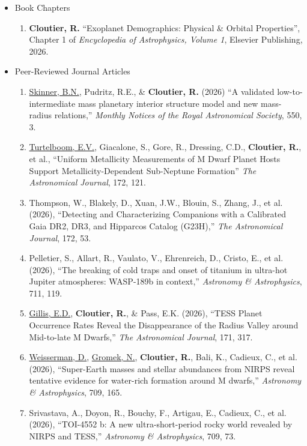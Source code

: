 \documentclass[12pt]{article}
\begin{document}
\begin{itemize}
\item Book Chapters
\begin{enumerate}
\item {\bf Cloutier, R.} ``Exoplanet Demographics: Physical \& Orbital Properties'', Chapter 1 of {\it Encyclopedia of Astrophysics, Volume 1}, Elsevier Publishing, 2026.
\end{enumerate}

\item Peer-Reviewed Journal Articles

\begin{enumerate}
\item \underline{Skinner, B.N.}, Pudritz, R.E., \& {\bf Cloutier, R.} (2026) ``A validated low-to-intermediate mass planetary interior structure model and new mass-radius relations,'' {\it  Monthly Notices of the Royal Astronomical Society}, 550, 3.
\item \underline{Turtelboom, E.V.}, Giacalone, S., Gore, R., Dressing, C.D., {\bf Cloutier, R.}, et al., ``Uniform Metallicity Measurements of M Dwarf Planet Hosts Support Metallicity-Dependent Sub-Neptune Formation'' {\it The Astronomical Journal}, 172, 121.
\item Thompson, W., Blakely, D., Xuan, J.W., Blouin, S., Zhang, J., et al. (2026), ``Detecting and Characterizing Companions with a Calibrated Gaia DR2, DR3, and Hipparcos Catalog (G23H),'' {\it The Astronomical Journal}, 172, 53.
\item Pelletier, S., Allart, R., Vaulato, V., Ehrenreich, D., Cristo, E., et al. (2026), ``The breaking of cold traps and onset of titanium in ultra-hot Jupiter atmospheres: WASP-189b in context,'' {\it Astronomy \& Astrophysics}, 711, 119.
\item \underline{Gillis, E.D.}, {\bf Cloutier, R.}, \& Pass, E.K. (2026), ``TESS Planet Occurrence Rates Reveal the Disappearance of the Radius Valley around Mid-to-late M Dwarfs,'' {\it The Astronomical Journal}, 171, 317.
\item \underline{Weisserman, D.}, \underline{Gromek, N.}, {\bf Cloutier, R.}, Bali, K., Cadieux, C., et al. (2026), ``Super-Earth masses and stellar abundances from NIRPS reveal tentative evidence for water-rich formation around M dwarfs,'' {\it Astronomy \& Astrophysics}, 709, 165.
\item Srivastava, A., Doyon, R., Bouchy, F., Artigau, E., Cadieux, C., et al. (2026), ``TOI-4552 b: A new ultra-short-period rocky world revealed by NIRPS and TESS,'' {\it Astronomy \& Astrophysics}, 709, 73.

\end{enumerate}
\end{itemize}
\end{document}
